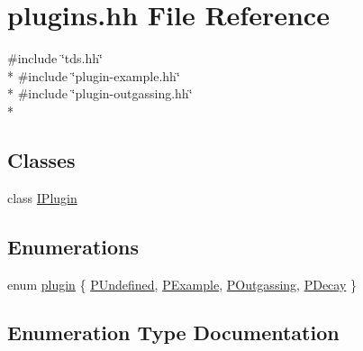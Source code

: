 \hypertarget{plugins_8hh}{}\section{plugins.\+hh File Reference}
\label{plugins_8hh}
{\ttfamily \#include \char`\"{}tds.\+hh\char`\"{}}\\*
{\ttfamily \#include \char`\"{}plugin-\/example.\+hh\char`\"{}}\\*
{\ttfamily \#include \char`\"{}plugin-\/outgassing.\+hh\char`\"{}}\\*
\subsection*{Classes}
\begin{DoxyCompactItemize}
\item 
class \hyperlink{classIPlugin}{I\+Plugin}
\end{DoxyCompactItemize}
\subsection*{Enumerations}
\begin{DoxyCompactItemize}
\item 
enum \hyperlink{plugins_8hh_af34747f68f9b0963dea6e8f3c659659c}{plugin} \{ \hyperlink{plugins_8hh_af34747f68f9b0963dea6e8f3c659659caef8cc3c410b63a535fb02f123e74598c}{P\+Undefined}, 
\hyperlink{plugins_8hh_af34747f68f9b0963dea6e8f3c659659cae7e7cdab251a40e69029367fbcdd2ee0}{P\+Example}, 
\hyperlink{plugins_8hh_af34747f68f9b0963dea6e8f3c659659ca475137862bea404eee26ddf1633063e0}{P\+Outgassing}, 
\hyperlink{plugins_8hh_af34747f68f9b0963dea6e8f3c659659cad09e6b492f9f7d43bc62b1010747d94a}{P\+Decay}
 \}
\end{DoxyCompactItemize}


\subsection{Enumeration Type Documentation}
